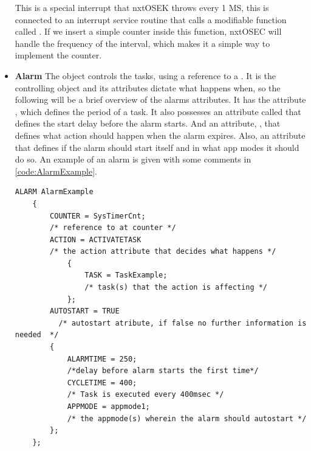 \begin{itemize}
    This is a special interrupt that nxtOSEK throws every 1 MS, this is connected to an interrupt service routine that calls a modifiable function called . If we insert a simple counter inside this function, nxtOSEC will handle the frequency of the interval, which makes it a simple way to implement the counter.
    \item{\textbf{Alarm}}
    The  object controls the tasks, using a reference to a . It is the controlling object and its attributes dictate what happens when, so the following will be a brief overview of the alarms attributes. It has the attribute , which defines the period of a task. It also possesses an attribute called  that defines the start delay before the alarm starts. And an attribute, , that defines what action should happen when the alarm expires. Also, an  attribute that defines if the alarm should start itself and in what app modes it should do so.  An example of an alarm is given with some comments in \ref{code:AlarmExample}.
    
    \begin{lstlisting}[frame=single, label={code:AlarmExample}, caption={A example of an alarm in OIL}, xleftmargin=.00\textwidth, xrightmargin=.00\textwidth]
    ALARM AlarmExample
    {
        COUNTER = SysTimerCnt;
        /* reference to at counter */
        ACTION = ACTIVATETASK 
        /* the action attribute that decides what happens */
            {
                TASK = TaskExample;
                /* task(s) that the action is affecting */
            };
        AUTOSTART = TRUE
          /* autostart atribute, if false no further information is needed  */
        { 
            ALARMTIME = 250;
            /*delay before alarm starts the first time*/
            CYCLETIME = 400; 
            /* Task is executed every 400msec */
            APPMODE = appmode1;
            /* the appmode(s) wherein the alarm should autostart */
        };
    };
    \end{lstlisting}
\end{itemize}
